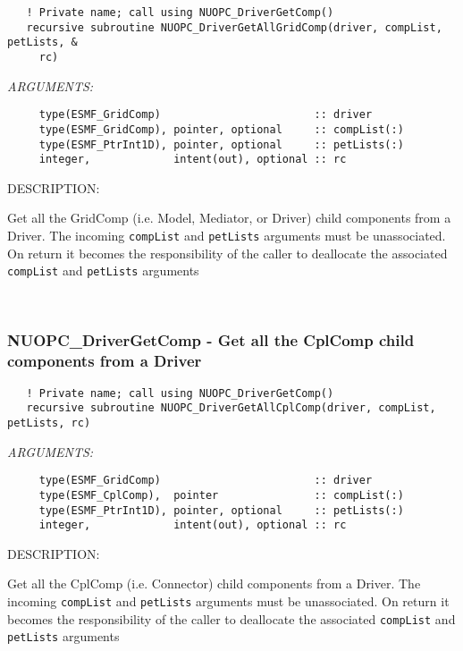   
\begin{verbatim}   ! Private name; call using NUOPC_DriverGetComp()
   recursive subroutine NUOPC_DriverGetAllGridComp(driver, compList, petLists, &
     rc)\end{verbatim}{\em ARGUMENTS:}
\begin{verbatim}     type(ESMF_GridComp)                        :: driver
     type(ESMF_GridComp), pointer, optional     :: compList(:)
     type(ESMF_PtrInt1D), pointer, optional     :: petLists(:)
     integer,             intent(out), optional :: rc \end{verbatim}
{\sf DESCRIPTION:\\ }


   Get all the GridComp (i.e. Model, Mediator, or Driver) child components from a
   Driver. The incoming {\tt compList} and {\tt petLists} arguments must be 
   unassociated. On return it becomes the responsibility of the caller to 
   deallocate the associated {\tt compList} and {\tt petLists} arguments 
 
\mbox{}\hrulefill\ 
 
\subsubsection [NUOPC\_DriverGetComp] {NUOPC\_DriverGetComp - Get all the CplComp child components from a Driver}


  
\begin{verbatim}   ! Private name; call using NUOPC_DriverGetComp()
   recursive subroutine NUOPC_DriverGetAllCplComp(driver, compList, petLists, rc)\end{verbatim}{\em ARGUMENTS:}
\begin{verbatim}     type(ESMF_GridComp)                        :: driver
     type(ESMF_CplComp),  pointer               :: compList(:)
     type(ESMF_PtrInt1D), pointer, optional     :: petLists(:)
     integer,             intent(out), optional :: rc \end{verbatim}
{\sf DESCRIPTION:\\ }


   Get all the CplComp (i.e. Connector) child components from a
   Driver. The incoming {\tt compList} and {\tt petLists} arguments must be 
   unassociated. On return it becomes the responsibility of the caller to 
   deallocate the associated {\tt compList} and {\tt petLists} arguments 
 
